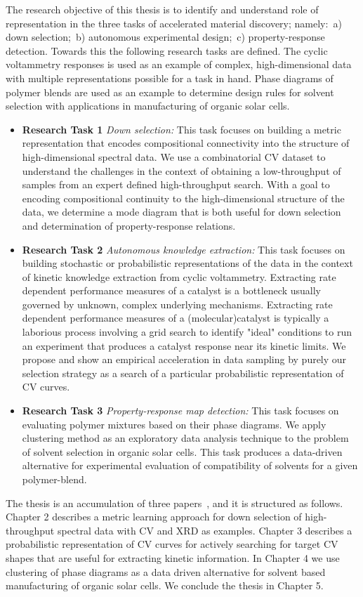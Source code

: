 The research objective of this thesis is to identify and understand role of representation in the three tasks of accelerated material discovery; namely:~a) down selection;~b) autonomous experimental design;~c) property-response detection. 
Towards this the following research tasks are defined. The cyclic voltammetry responses is used as an example of complex, high-dimensional data with multiple representations possible for a task in hand. Phase diagrams of polymer blends are used as an example to determine design rules for solvent selection with applications in manufacturing of organic solar cells.
\begin{itemize}
    \item {\textbf{Research Task 1 }\textit{Down selection:} This task focuses on building a metric representation that encodes compositional connectivity into the structure of high-dimensional spectral data. We use a combinatorial CV dataset to understand the challenges in the context of obtaining a low-throughput of samples from an expert defined high-throughput search. With a goal to encoding compositional continuity to the high-dimensional structure of the data, we determine a mode diagram that is both useful for down selection and determination of property-response relations.}
    \item{\textbf{Research Task 2 }\textit{Autonomous knowledge extraction:} This task focuses on building stochastic or probabilistic representations of the data in the context of kinetic knowledge extraction from cyclic voltammetry. Extracting rate dependent performance measures of a catalyst is a bottleneck usually governed by unknown, complex underlying mechanisms. Extracting rate dependent performance measures of a (molecular)catalyst is typically a laborious process involving a grid search to identify "ideal" conditions to run an experiment that produces a catalyst response near its kinetic limits. We propose and show an empirical acceleration in data sampling by purely our selection strategy as a search of a particular probabilistic representation of CV curves.}
    \item{\textbf{Research Task 3 }\textit{Property-response map detection: } This task focuses on evaluating polymer mixtures based on their phase diagrams. We apply clustering method as an exploratory data analysis technique to the problem of solvent selection in organic solar cells. This task produces a data-driven alternative for experimental evaluation of compatibility of solvents for a given polymer-blend.}
\end{itemize}

The thesis is an accumulation of three papers~\cite{MLCD}, and it is structured as follows. 
Chapter 2 describes a metric learning approach for down selection of high-throughput spectral data with CV and XRD as examples. 
Chapter 3 describes a probabilistic representation of CV curves for actively searching for target CV shapes that are useful for extracting kinetic information. 
In Chapter 4 we use clustering of phase diagrams as a data driven alternative for solvent based manufacturing of organic solar cells. 
We conclude the thesis in Chapter 5.
